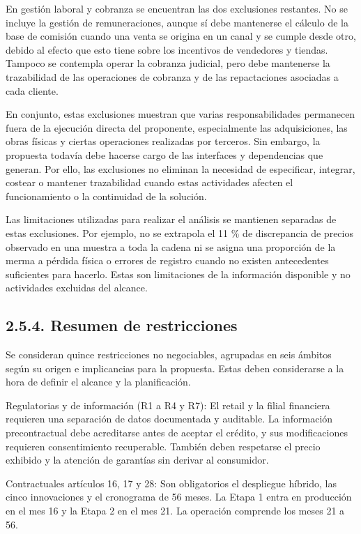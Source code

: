 \documentclass[11pt]{article}
\begin{document}
En gestión laboral y cobranza se encuentran las dos exclusiones restantes. No se incluye la gestión de remuneraciones, aunque sí debe mantenerse el cálculo de la base de comisión cuando una venta se origina en un canal y se cumple desde otro, debido al efecto que esto tiene sobre los incentivos de vendedores y tiendas. Tampoco se contempla operar la cobranza judicial, pero debe mantenerse la trazabilidad de las operaciones de cobranza y de las repactaciones asociadas a cada cliente.

En conjunto, estas exclusiones muestran que varias responsabilidades permanecen fuera de la ejecución directa del proponente, especialmente las adquisiciones, las obras físicas y ciertas operaciones realizadas por terceros. Sin embargo, la propuesta todavía debe hacerse cargo de las interfaces y dependencias que generan. Por ello, las exclusiones no eliminan la necesidad de especificar, integrar, costear o mantener trazabilidad cuando estas actividades afecten el funcionamiento o la continuidad de la solución.

Las limitaciones utilizadas para realizar el análisis se mantienen separadas de estas exclusiones. Por ejemplo, no se extrapola el 11 \% de discrepancia de precios observado en una muestra a toda la cadena ni se asigna una proporción de la merma a pérdida física o errores de registro cuando no existen antecedentes suficientes para hacerlo. Estas son limitaciones de la información disponible y no actividades excluidas del alcance.

\subsection{2.5.4. Resumen de restricciones}\label{resumen-de-restricciones}

Se consideran quince restricciones no negociables, agrupadas en seis ámbitos según su origen e implicancias para la propuesta. Estas deben considerarse a la hora de definir el alcance y la planificación.

Regulatorias y de información (R1 a R4 y R7): El retail y la filial financiera requieren una separación de datos documentada y auditable. La información precontractual debe acreditarse antes de aceptar el crédito, y sus modificaciones requieren consentimiento recuperable. También deben respetarse el precio exhibido y la atención de garantías sin derivar al consumidor.

Contractuales artículos 16, 17 y 28: Son obligatorios el despliegue híbrido, las cinco innovaciones y el cronograma de 56 meses. La Etapa 1 entra en producción en el mes 16 y la Etapa 2 en el mes 21. La operación comprende los meses 21 a 56.
\end{document}
